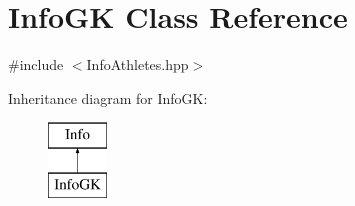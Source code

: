 \hypertarget{class_info_g_k}{}\section{Info\+GK Class Reference}
\label{class_info_g_k}


{\ttfamily \#include $<$Info\+Athletes.\+hpp$>$}

Inheritance diagram for Info\+GK\+:\begin{figure}[H]
\begin{center}
\leavevmode
\includegraphics[height=2.000000cm]{class_info_g_k}
\end{center}
\end{figure}
